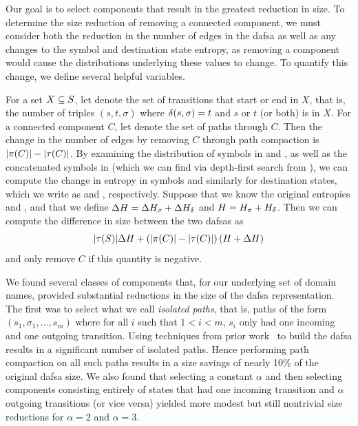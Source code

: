 Our goal is to select components that result in the greatest reduction in size.
To determine the size reduction of removing a connected component, we must
consider both the reduction in the number of edges in the \ac{dafsa} as well as
any changes to the symbol and destination state entropy, as removing a component
would cause the distributions underlying these values to change. To quantify
this change, we define several helpful variables.

For a set $X \subseteq S$, let  denote the set of transitions
that start or end in $X$, that is, the number of triples $(s, t, \sigma)$ where
$\delta(s, \sigma) = t$ and $s$ or $t$ (or both) is in $X$. For a connected
component $C$, let  denote the set of paths through $C$. Then the
change in the number of edges by removing $C$ through path compaction is
$|\pi(C)| - |\tau(C)|$. By examining the distribution of symbols in
 and , as well as the concatenated symbols in
 (which we can find via depth-first search from ), we
can compute the change in entropy in symbols and similarly for destination
states, which we write as \symboldh and \destdh, respectively. Suppose that we know the
original entropies \symbolh and \desth, and that we define $\Delta H = \Delta H_\sigma +
\Delta H_\delta$ and $H = H_\sigma + H_\delta$. Then we can compute the difference in
size between the two \acp{dafsa} as
\begin{equation}
  |\tau(S)| \Delta H + \left(|\pi(C)| - |\tau(C)|\right)
  (H + \Delta H)
\end{equation}
and only remove $C$ if this quantity is negative.

We found several classes of components that, for our underlying set of domain
names, provided substantial reductions in the size of the \ac{dafsa}
representation. The first was to select what we call \emph{isolated paths}, that
is, paths of the form $(s_1, \sigma_1, \ldots, s_m)$ where for all $i$ such that
$1 < i < m$, $s_i$ only had one incoming and one outgoing transition. 
Using techniques from prior work~\cite{daciuk2000incremental} to build the \ac{dafsa} 
results in a significant number of isolated paths.
Hence performing path compaction on all such paths
results in a size savings of nearly 10\% of the original \ac{dafsa} size.
We also found that selecting a constant $\alpha$ and then selecting components
consisting entirely of states that had one incoming transition and $\alpha$
outgoing transitions (or vice versa) yielded more modest but still nontrivial
size reductions for $\alpha = 2$ and $\alpha = 3$.

